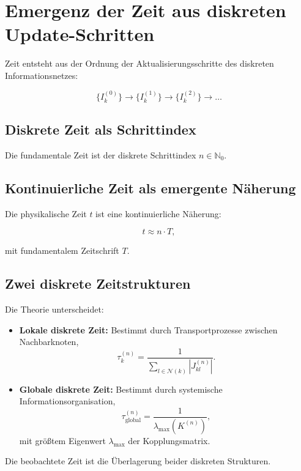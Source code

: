 \section{Emergenz der Zeit aus diskreten Update-Schritten}
\label{sec:zeitemergenz}

Zeit entsteht aus der Ordnung der Aktualisierungsschritte des diskreten Informationsnetzes:

\[
\{I_k^{(0)}\} \to \{I_k^{(1)}\} \to \{I_k^{(2)}\} \to \dots
\]

\subsection{Diskrete Zeit als Schrittindex}
\label{sub:diskrete_zeit_schrittindex}

Die fundamentale Zeit ist der diskrete Schrittindex \( n \in \mathbb{N}_0 \).

\subsection{Kontinuierliche Zeit als emergente Näherung}
\label{sub:kontinuierliche_zeit}

Die physikalische Zeit \( t \) ist eine kontinuierliche Näherung:

\[
t \approx n \cdot T,
\]

mit fundamentalem Zeitschrift \( T \).

\subsection{Zwei diskrete Zeitstrukturen}
\label{sub:zwei_zeitstrukturen}

Die Theorie unterscheidet:

\begin{itemize}
    \item \textbf{Lokale diskrete Zeit:} Bestimmt durch Transportprozesse zwischen Nachbarknoten,
    \[
    \tau_k^{(n)} = \frac{1}{\sum_{l \in \mathcal{N}(k)} |J_{kl}^{(n)}|}.
    \]
    \item \textbf{Globale diskrete Zeit:} Bestimmt durch systemische Informationsorganisation,
    \[
    \tau_{\text{global}}^{(n)} = \frac{1}{\lambda_{\text{max}}(K^{(n)})},
    \]
    mit größtem Eigenwert \( \lambda_{\text{max}} \) der Kopplungsmatrix.
\end{itemize}

Die beobachtete Zeit ist die Überlagerung beider diskreten Strukturen.

